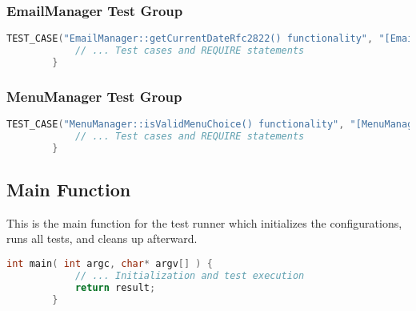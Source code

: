 \documentclass{article}
\begin{document}
	
	\subsubsection*{EmailManager Test Group}
	\begin{mdframed}[backgroundcolor=background, hidealllines=false, innerleftmargin=15pt, innerrightmargin=5pt, innertopmargin=-5pt, innerbottommargin=-7pt]
	\begin{lstlisting}[language=C++]
		TEST_CASE("EmailManager::getCurrentDateRfc2822() functionality", "[EmailManager]") {
			// ... Test cases and REQUIRE statements
		}
	\end{lstlisting}
	\end{mdframed}
	
	
	\subsubsection*{MenuManager Test Group}
	\begin{mdframed}[backgroundcolor=background, hidealllines=false, innerleftmargin=15pt, innerrightmargin=5pt, innertopmargin=-5pt, innerbottommargin=-7pt]
	\begin{lstlisting}[language=C++]
		TEST_CASE("MenuManager::isValidMenuChoice() functionality", "[MenuManager]") {
			// ... Test cases and REQUIRE statements
		}
	\end{lstlisting}
	\end{mdframed}
	
	
	\subsection*{Main Function}
	This is the main function for the test runner which initializes the configurations, runs all tests, and cleans up afterward.

	\begin{mdframed}[backgroundcolor=background, hidealllines=false, innerleftmargin=15pt, innerrightmargin=5pt, innertopmargin=-5pt, innerbottommargin=-7pt]
	\begin{lstlisting}[language=C++]
		int main( int argc, char* argv[] ) {
			// ... Initialization and test execution
			return result;
		}
	\end{lstlisting}
\end{mdframed}
	
\end{document}
